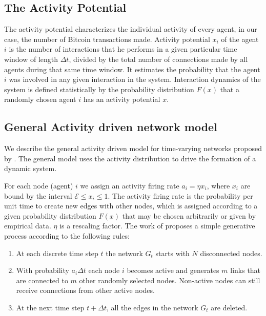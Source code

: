 \documentclass[../../thesis.tex]{subfiles}
\begin{document}
\subsection{The Activity Potential}
\label{sec:activity_driven_model_activity_potential}


The activity potential characterizes the individual activity of every agent, in our case, the number of Bitcoin transactions made. Activity potential $x_{i}$ of the agent $i$ is the number of interactions that he performs in a given particular time window of length $\Delta t$, divided by the total number of connections made by all agents during that same time window. It estimates the probability that the agent $i$ was involved in any given interaction in the system.  Interaction dynamics of the system is defined statistically by the probability distribution $F(x)$ that a randomly chosen agent $i$ has an activity potential $x$.


\subsection{General Activity driven network model}
\label{sec:activity_driven_model_network}

We describe the general activity driven model for time-varying networks proposed by \cite{perra2012activity}. The general model uses the activity distribution to drive the formation of a dynamic system.

For each node (agent) $i$ we assign an activity firing rate $a_{i}=\eta x_{i}$, where $x_{i}$ are bound by the interval  $\mathcal{E} \leq x_{i} \leq 1$. The activity firing rate is the probability per unit time to create new edges with other nodes, which is assigned according to a given probability distribution $F(x)$ that may be chosen arbitrarily or given by empirical data. $\eta$ is a rescaling factor. The work of \cite{perra2012activity} proposes a simple generative process according to the following rules:
\begin{enumerate}
  \item{At each discrete time step $t$ the network $G_{t}$ starts with $N$ disconnected nodes.}
  \item{With probability $a_{i}\Delta t$ each node $i$ becomes active and generates $m$ links that are connected to $m$ other randomly selected nodes. Non-active nodes can still receive connections from other active nodes.}
  \item{At the next time step $t+\Delta t$, all the edges in the network $G_{t}$ are deleted. }
\end{enumerate}
\end{document}

